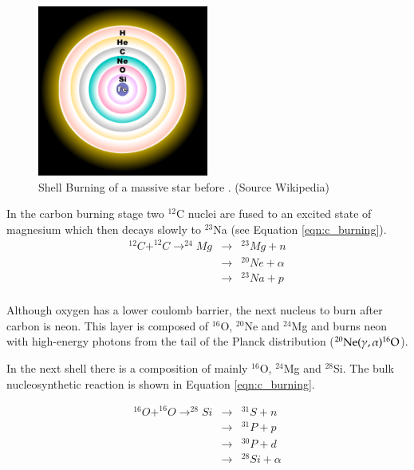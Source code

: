 \begin{figure}[htbp] %
   \centering
   \includegraphics[width=0.5\textwidth]{chapter_intro/plots/fusion_shells.pdf} 
   \caption[Shell Burning of a massive star before SN II]{Shell Burning of a massive star before . (Source  Wikipedia)}
   \label{fig:fusion_shells}
\end{figure}


In the carbon burning stage two $^{12}$C nuclei are fused to an excited state of magnesium which then decays slowly to $^{23}$Na (see Equation \ref{eqn:c_burning}).
\begin{eqnarray}
^{12}C+^{12}C\rightarrow^{24}Mg&\rightarrow&^{23}Mg+n \nonumber \\
	&\rightarrow&^{20}Ne + \alpha \nonumber \\
	&\rightarrow&^{23}Na +p \nonumber \\
	\label{eqn:c_burning}
\end{eqnarray}

Although oxygen has a lower coulomb barrier, the next nucleus to burn after carbon is neon. This layer is composed of  $^{16}$O, $^{20}$Ne and $^{24}$Mg and burns neon with high-energy photons from the tail of the Planck distribution ($\rm ^{20}Ne(\gamma,\alpha)^{16}O$). 

In the next shell there is a composition of mainly $^{16}$O, $^{24}$Mg and $^{28}$Si. The bulk nucleosynthetic reaction is shown in Equation \ref{eqn:c_burning}. 

\begin{eqnarray}
^{16}O+^{16}O\rightarrow^{28}Si&\rightarrow&^{31}S+n \nonumber \\
	&\rightarrow&^{31}P + p \nonumber \\
	&\rightarrow&^{30}P + d \nonumber \\
	&\rightarrow&^{28}Si + \alpha \nonumber \\
	\label{eqn:c_burning}
\end{eqnarray}

